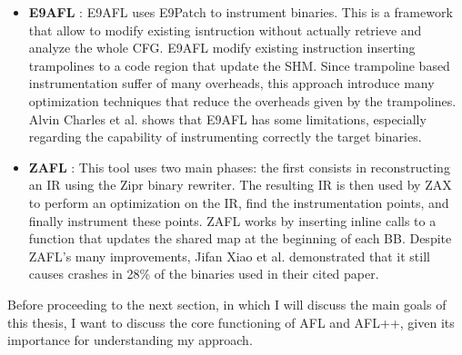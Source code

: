 \begin{itemize}
\begin{itemize}
                \item \textbf{E9AFL} \cite{E9AFL} : E9AFL uses E9Patch \cite{E9Patch} to instrument binaries.
                    This is a framework that allow to modify existing isntruction without actually retrieve and 
                    analyze the whole \gls{CFG}. 
                    E9AFL modify existing instruction inserting trampolines to a code region that update the \gls{SHM}.
                    Since trampoline based instrumentation suffer of many overheads, this approach introduce many 
                    optimization techniques that reduce the overheads given by the trampolines. 
                    Alvin Charles et al. \cite{PeAR} shows that E9AFL has some limitations, especially regarding the 
                    capability of instrumenting correctly the target binaries.

                \item \textbf{ZAFL} \cite{zafl}: This tool uses two main phases: the first consists in
                    reconstructing an \gls{IR} using the Zipr binary rewriter.
                    The resulting \gls{IR} is then used by ZAX to perform an optimization on the \gls{IR}, find the instrumentation points,
                    and finally instrument these points. ZAFL works by inserting inline calls to a function that updates the shared map
                    at the beginning of each \gls{BB}.
                    Despite ZAFL's many improvements, Jifan Xiao et al. \cite{SystemCallPatternTracing} demonstrated that
                    it still causes crashes in 28\% of the binaries used in their cited paper.
            \end{itemize}
    \end{itemize}
    Before proceeding to the next section, in which I will discuss the main goals of this thesis, I want to discuss the core functioning of AFL and AFL++,
    given its importance for understanding my approach.
